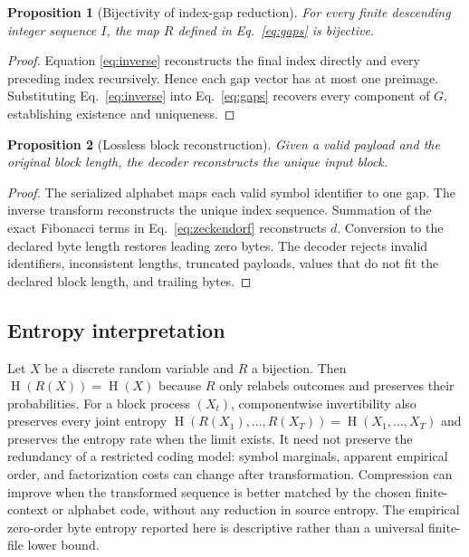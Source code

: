 \documentclass[a4paper,fleqn]{cas-dc}
\newtheorem{proposition}{Proposition}
\DeclareMathOperator{\Hemp}{H}
\begin{document}
\begin{proposition}[Bijectivity of index-gap reduction]
For every finite descending integer sequence $I$, the map $R$ defined in
Eq.~\eqref{eq:gaps} is bijective.
\end{proposition}

\begin{proof}
Equation \eqref{eq:inverse} reconstructs the final index directly and every
preceding index recursively. Hence each gap vector has at most one preimage.
Substituting Eq.~\eqref{eq:inverse} into Eq.~\eqref{eq:gaps} recovers every
component of $G$, establishing existence and uniqueness.
\end{proof}

\begin{proposition}[Lossless block reconstruction]
Given a valid payload and the original block length, the decoder reconstructs
the unique input block.
\end{proposition}

\begin{proof}
The serialized alphabet maps each valid symbol identifier to one gap. The
inverse transform reconstructs the unique index sequence. Summation of the
exact Fibonacci terms in Eq.~\eqref{eq:zeckendorf} reconstructs $d$. Conversion
to the declared byte length restores leading zero bytes. The decoder rejects
invalid identifiers, inconsistent lengths, truncated payloads, values that do
not fit the declared block length, and trailing bytes.
\end{proof}

\subsection{Entropy interpretation}

Let $X$ be a discrete random variable and $R$ a bijection. Then
$\Hemp(R(X))=\Hemp(X)$ because $R$ only relabels outcomes and preserves their
probabilities. For a block process $(X_t)$, componentwise invertibility also
preserves every joint entropy
$\Hemp(R(X_1),\ldots,R(X_T))=\Hemp(X_1,\ldots,X_T)$ and preserves
the entropy rate when the limit exists. It need not preserve the redundancy
of a restricted coding model: symbol marginals, apparent empirical order, and
factorization costs can change after transformation. Compression can improve
when the transformed sequence is better matched by the
chosen finite-context or alphabet code, without any reduction in source
entropy. The empirical zero-order byte entropy reported here is
descriptive rather than a universal finite-file lower bound.
\end{document}
